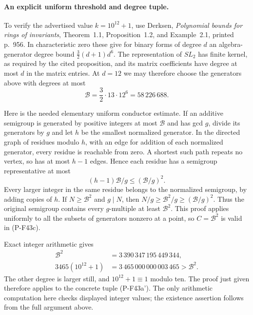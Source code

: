 \paragraph{An explicit uniform threshold and degree tuple.}
To verify the advertised value $k=10^{12}+1$, use Derksen,
\emph{Polynomial bounds for rings of invariants},
Theorem~1.1, Proposition~1.2, and Example~2.1, printed
p.~956. In characteristic zero these give for binary
forms of degree $d$ an algebra-generator degree bound
$\frac32(d+1)d^6$. The representation of $SL_2$ has finite
kernel, as required by the cited proposition, and its
matrix coefficients have degree at most $d$ in the
matrix entries. At $d=12$ we may therefore choose the
generators above with degrees at most
\[
              \mathcal B=\frac32\cdot13\cdot12^6
                        =58\,226\,688.
 \tag{P-F43h}
\]

Here is the needed elementary uniform conductor estimate.
If an additive semigroup is generated by positive integers
at most $\mathcal B$ and has gcd $g$, divide its generators
by $g$ and let $h$ be the smallest normalized generator.
In the directed graph of residues modulo $h$, with an
edge for addition of each normalized generator, every
residue is reachable from zero. A shortest such path
repeats no vertex, so has at most $h-1$ edges. Hence each
residue has a semigroup representative at most
\[
            (h-1)\mathcal B/g\le(\mathcal B/g)^2.
\]
Every larger integer in the same residue belongs to the
normalized semigroup, by adding copies of $h$.
If $N\ge\mathcal B^2$ and $g\mid N$, then
$N/g\ge\mathcal B^2/g\ge(\mathcal B/g)^2$.
Thus the original semigroup contains every $g$-multiple
at least $\mathcal B^2$. This proof applies uniformly to
all the subsets of generators nonzero at a point, so
$C=\mathcal B^2$ is valid in (P-F43c).

Exact integer arithmetic gives
\[
 \begin{split}
 \mathcal B^2&=3\,390\,347\,195\,449\,344,\\
 3465(10^{12}+1)&=3\,465\,000\,000\,003\,465
                        >\mathcal B^2.
 \end{split}
\]
The other degree is larger still, and $10^{12}+1\equiv1$
modulo ten. The proof just given therefore applies to
the concrete tuple (P-F43a'). The only arithmetic
computation here checks displayed integer values; the
existence assertion follows from the full argument above.

